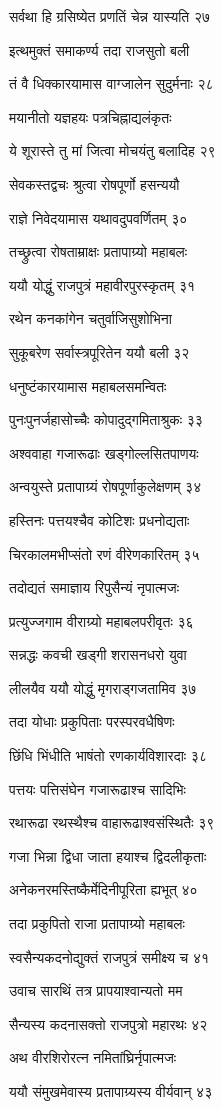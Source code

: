 सर्वथा हि ग्रसिष्येत प्रणतिं चेन्न यास्यति २७

इत्थमुक्तं समाकर्ण्य तदा राजसुतो बली

तं वै धिक्कारयामास वाग्जालेन सुदुर्मनाः २८

मयानीतो यज्ञहयः पत्रचिह्नाद्यलंकृतः

ये शूरास्ते तु मां जित्वा मोचयंतु बलादिह २९

सेवकस्तद्वचः श्रुत्वा रोषपूर्णो हसन्ययौ

राज्ञे निवेदयामास यथावदुपवर्णितम् ३०

तच्छ्रुत्वा रोषताम्राक्षः प्रतापाग्र्यो महाबलः

ययौ योद्धुं राजपुत्रं महावीरपुरस्कृतम् ३१

रथेन कनकांगेन चतुर्वाजिसुशोभिना

सुकूबरेण सर्वास्त्रपूरितेन ययौ बली ३२

धनुष्टंकारयामास महाबलसमन्वितः

पुनःपुनर्जहासोच्चैः कोपादुद्गमिताश्रुकः ३३

अश्ववाहा गजारूढाः खड्गोल्लसितपाणयः

अन्वयुस्ते प्रतापाग्र्यं रोषपूर्णाकुलेक्षणम् ३४

हस्तिनः पत्तयश्चैव कोटिशः प्रधनोद्यताः

चिरकालमभीप्संतो रणं वीरेणकारितम् ३५

तदोद्यतं समाज्ञाय रिपुसैन्यं नृपात्मजः

प्रत्युज्जगाम वीराग्र्यो महाबलपरीवृतः ३६

सन्नद्धः कवची खड्गी शरासनधरो युवा

लीलयैव ययौ योद्धुं मृगराड्गजतामिव ३७

तदा योधाः प्रकुपिताः परस्परवधैषिणः

छिंधि भिंधीति भाषंतो रणकार्यविशारदाः ३८

पत्तयः पत्तिसंघेन गजारूढाश्च सादिभिः

रथारूढा रथस्थैश्च वाहारूढाश्वसंस्थितैः ३९

गजा भिन्ना द्विधा जाता हयाश्च द्विदलीकृताः

अनेकनरमस्तिष्कैर्मेदिनीपूरिता ह्यभूत् ४०

तदा प्रकुपितो राजा प्रतापाग्र्यो महाबलः

स्वसैन्यकदनोद्युक्तं राजपुत्रं समीक्ष्य च ४१

उवाच सारथिं तत्र प्रापयाश्वान्यतो मम

सैन्यस्य कदनासक्तो राजपुत्रो महारथः ४२

अथ वीरशिरोरत्न नमितांघ्रिर्नृपात्मजः

ययौ संमुखमेवास्य प्रतापाग्र्यस्य वीर्यवान् ४३

